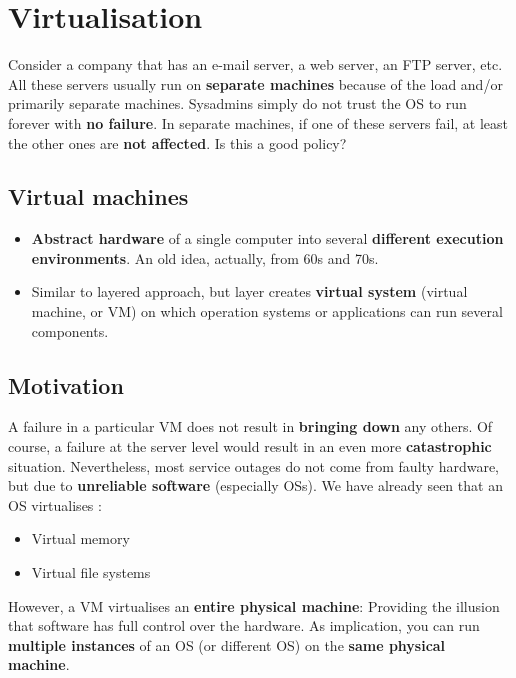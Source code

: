 \documentclass{article}
\begin{document}
\section{Virtualisation}
\begin{flushleft}
Consider a company that has an e-mail server, a web server, an FTP server, etc. All these servers usually run on \textbf{separate machines} because of the load and/or primarily separate machines. Sysadmins simply do not trust the OS to run forever with \textbf{no failure}. In separate machines, if one of these servers fail, at least the other ones are \textbf{not affected}. Is this a good policy?
\end{flushleft}

\subsection{Virtual machines}
\begin{itemize}
	\item \textbf{Abstract hardware} of a single computer into several \textbf{different execution environments}. An old idea, actually, from 60s and 70s.
	\item Similar to layered approach, but layer creates \textbf{virtual system} (virtual machine, or VM) on which operation systems or applications can run several components.
\end{itemize}

\subsection{Motivation}
\begin{flushleft}
A failure in a particular VM does not result in \textbf{bringing down} any others. Of course, a failure at the server level would result in an even more \textbf{catastrophic} situation. Nevertheless, most service outages do not come from faulty hardware, but due to \textbf{unreliable software} (especially OSs).
\bigskip
We have already seen that an OS virtualises : 
\begin{itemize}
	\item Virtual memory
	\item Virtual file systems 
\end{itemize}
However, a VM virtualises an \textbf{entire physical machine}: Providing the illusion that software has full control over the hardware. As implication, you can run \textbf{multiple instances} of an OS (or different OS) on the \textbf{same physical machine}.
\end{flushleft}
\end{document}
